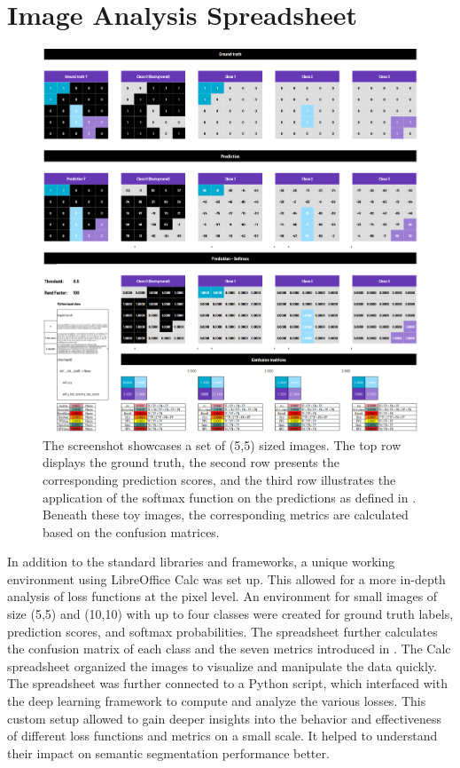 \section{Image Analysis Spreadsheet}
\label{sec:image_analysis_spreadsheet}
\begin{figure}[H]%
  \centering
  \includegraphics[width=\imgWidthXL]{images/workstation.png}
  \caption[Image Analysis Spreadsheet]{The screenshot showcases a set of (5,5) sized images. The top row displays the ground truth, the second row presents the corresponding prediction scores, and the third row illustrates the application of the softmax function on the predictions as defined in . Beneath these toy images, the corresponding metrics are calculated based on the confusion matrices.}
  \label{workstation}
\end{figure}
In addition to the standard libraries and frameworks, a unique working environment using LibreOffice Calc was set up. This allowed for a more in-depth analysis of loss functions at the pixel level. An environment for small images of size (5,5) and (10,10) with up to four classes were created for ground truth labels, prediction scores, and softmax probabilities. The spreadsheet further calculates the confusion matrix of each class and the seven metrics introduced in . The Calc spreadsheet organized the images to visualize and manipulate the data quickly. The spreadsheet was further connected to a Python script, which interfaced with the deep learning framework to compute and analyze the various losses. This custom setup allowed to gain deeper insights into the behavior and effectiveness of different loss functions and metrics on a small scale. It helped to understand their impact on semantic segmentation performance better.
